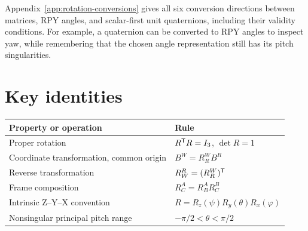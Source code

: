 Appendix~\ref{app:rotation-conversions} gives all six conversion directions
between matrices, RPY angles, and scalar-first unit quaternions, including
their validity conditions. For example, a quaternion can be converted to
RPY angles to inspect yaw, while remembering that the chosen angle
representation still has its pitch singularities.

\section{Key identities}
\begin{center}
\renewcommand{\arraystretch}{1.3}
\begin{tabular}{ll}
\toprule
Property or operation & Rule \\
\midrule
Proper rotation & $R^{\mathsf T} R=I_3$, $\det R=1$ \\
Coordinate transformation, common origin & $B^W=R_R^W B^R$ \\
Reverse transformation & $R_W^R=(R_R^W)^{\mathsf T}$ \\
Frame composition & $R_C^A=R_B^A R_C^B$ \\
Intrinsic Z--Y--X convention & $R=R_z(\psi)R_y(\theta)R_x(\varphi)$ \\
Nonsingular principal pitch range & $-\pi/2<\theta<\pi/2$ \\
\bottomrule
\end{tabular}
\end{center}

\clearpage
